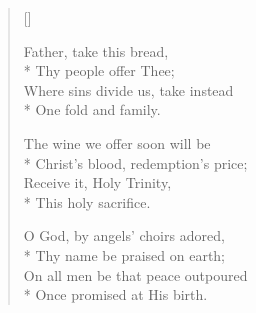\newHymn
{}

\begin{verse}[\versewidth]
\begin{altverse}
 Father, take this bread,\\*
Thy people offer Thee;\\
Where sins divide us, take instead\\*
One fold and family.
\end{altverse}

\begin{altverse}
The wine we offer soon will be\\*
Christ's blood, redemption's price;\\
Receive it, Holy Trinity,\\*
This holy sacrifice.
\end{altverse}

\begin{altverse}
O God, by angels' choirs adored,\\*
Thy name be praised on earth;\\
On all men be that peace outpoured\\*
Once promised at His birth.
\end{altverse}
\end{verse}



